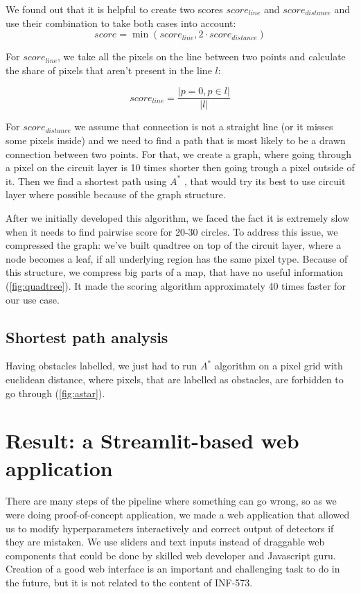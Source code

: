 \documentclass[a4paper,12pt]{extarticle}
\begin{document}
We found out that it is helpful to create two scores $score_{line}$ and $score_{distance}$ and use their combination to take both cases into account:
$$score = \min(score_{line}, 2 \cdot score_{distance})$$

For $score_{line}$, we take all the pixels on the line between two points and calculate the share of pixels that aren't present in the line $l$:

$$score_{line} = \frac{|p = 0, p \in l|}{|l|}$$

For $score_{distance}$ we assume that connection is not a straight line (or it misses some pixels inside) and we need to find a path that is most likely to be a drawn connection between two points.
For that, we create a graph, where going through a pixel on the circuit layer is 10 times shorter then going trough a pixel outside of it.
Then we find a shortest path using $A^*$ \cite{astar}, that would try its best to use circuit layer where possible because of the graph structure.

After we initially developed this algorithm, we faced the fact it is extremely slow when it needs to find pairwise score for 20-30 circles.
To address this issue, we compressed the graph: we've built quadtree \cite{quadtree} on top of the circuit layer, where a node becomes a leaf, if all underlying region has the same pixel type.
Because of this structure, we compress big parts of a map, that have no useful information (\cref{fig:quadtree}).
It made the scoring algorithm approximately 40 times faster for our use case.

\subsection{Shortest path analysis}

Having obstacles labelled, we just had to run $A^*$ algorithm \cite{astar} on a pixel grid with euclidean distance, where pixels, that are labelled as obstacles, are forbidden to go through (\cref{fig:astar}).

\section{Result: a Streamlit-based web application}

There are many steps of the pipeline where something can go wrong, so as we were doing proof-of-concept application, we made a web application that allowed us to modify hyperparameters interactively and correct output of detectors if they are mistaken.
We use sliders and text inputs instead of draggable web components that could be done by skilled web developer and Javascript guru.
Creation of a good web interface is an important and challenging task to do in the future, but it is not related to the content of INF-573.
\end{document}
